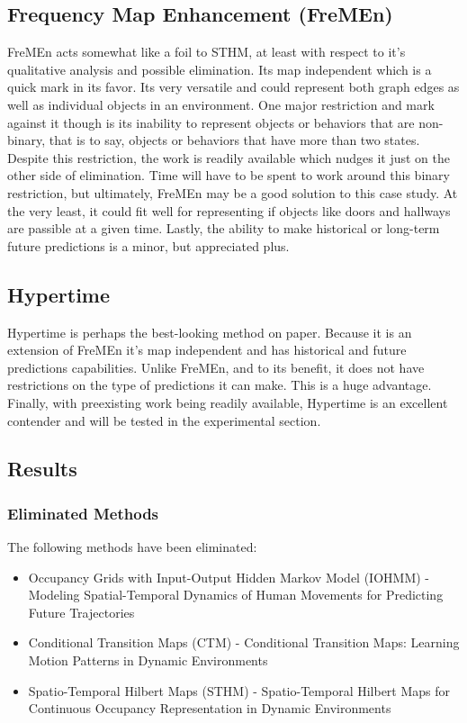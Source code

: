   \subsection { Frequency Map Enhancement (FreMEn) }
  FreMEn acts somewhat like a foil to STHM, at least with respect to it's
  qualitative analysis and possible elimination. Its map independent which is
  a quick mark in its favor. Its very versatile and could represent both graph
  edges as well as individual objects in an environment. One major restriction
  and mark against it though is its inability to represent objects or behaviors
  that are non-binary, that is to say, objects or behaviors that have more than
  two states. Despite this restriction, the work is readily available which
  nudges it just on the other side of elimination. Time will have to be spent
  to work around this binary restriction, but ultimately, FreMEn may be a good
  solution to this case study. At the very least, it could fit well for
  representing if objects like doors and hallways are passible at a given time.
  Lastly, the ability to make historical or long-term future predictions is
  a minor, but appreciated plus. \\

  \subsection { Hypertime }
  Hypertime is perhaps the best-looking method on paper. Because it is an
  extension of FreMEn it's map independent
  and has historical and future predictions capabilities. Unlike FreMEn, and to its benefit, it does not have
  restrictions on the type of predictions it can make. This is
  a huge advantage. Finally, with preexisting work being readily available, Hypertime
  is an excellent contender and will be tested in the experimental section. \\

  \subsection{ Results }
  \subsubsection{ Eliminated Methods }
  The following methods have been eliminated:
  \begin{itemize}
    \item Occupancy Grids with Input-Output Hidden Markov Model (IOHMM) - Modeling Spatial-Temporal Dynamics of Human Movements for Predicting Future Trajectories \cite{Wang2015}
    \item Conditional Transition Maps (CTM) - Conditional Transition Maps: Learning Motion Patterns in Dynamic Environments \cite{Kucner2013}
    \item Spatio-Temporal Hilbert Maps (STHM) - Spatio-Temporal Hilbert Maps for Continuous Occupancy Representation in Dynamic Environments \cite{Senanayake2016}
  \end{itemize}

